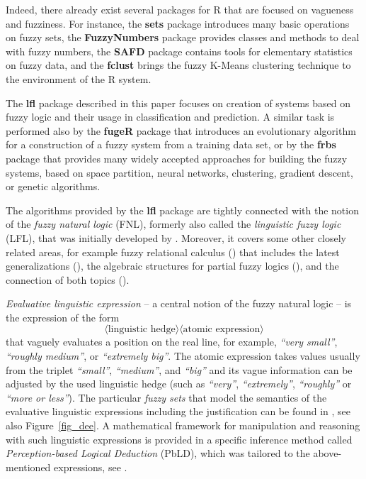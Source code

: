 \documentclass[review]{elsarticle}
\newcommand{\pkg}[1]{\textbf{#1}}
\newcommand{\proglang}[1]{#1}
\newcommand{\R}{\proglang{R}}
\begin{document}
Indeed, there already exist several packages for \R{} that are focused on vagueness and fuzziness. For instance, the \pkg{sets} package \citep{setsPkg} introduces many basic operations on fuzzy sets, the \pkg{FuzzyNumbers} package \citep{FuzzyNumbersPkg} provides classes and methods to deal with fuzzy numbers, the \pkg{SAFD} package \citep{safdPkg} contains tools for elementary statistics on fuzzy data, and the \pkg{fclust} \citep{fclustPkg} brings the fuzzy K-Means clustering technique to the environment of the \R{} system.

The \pkg{lfl} package described in this paper focuses on creation of systems based on fuzzy logic and their
usage in classification and prediction. A similar task is performed also by the \pkg{fugeR}
package \citep{fugeRPkg} that introduces an evolutionary algorithm for a construction of a fuzzy system from
a training data set, or by the \pkg{frbs} package \citep{frbsPkg} that provides many widely
accepted approaches for building the fuzzy systems, based on space partition, neural networks,
clustering, gradient descent, or genetic algorithms.

The algorithms provided by the \pkg{lfl} package are tightly connected with the notion of
the \emph{fuzzy natural logic} (FNL), formerly also called the \emph{linguistic fuzzy logic} (LFL),
that was initially developed by \cite{Novak08}. Moreover, it covers some other closely related areas, for example fuzzy relational calculus  (\cite{BandlerKohout78,Belohlavek_book2002,Behounek:Compositions})  that includes the latest generalizations (\cite{Cao2017, Cao2017b}), the algebraic structures for partial fuzzy logics (\cite{BehounekNovak:IEEE15, BehounekDankova:IPMU16}), and the connection of both topics (\cite{Step_etal_Dragon_IJAR2019}).

\emph{Evaluative linguistic expression} -- a central notion of the fuzzy natural logic -- is the expression of the form
%
$$\langle \textrm{linguistic hedge}\rangle \langle \textrm{atomic expression}\rangle$$
%
that vaguely evaluates a position on the real line, for example, \emph{``very small''}, \emph{``roughly medium''}, or \emph{``extremely big''}. The atomic expression takes values usually from the triplet 
\emph{``small''}, \emph{``medium''}, and \emph{``big''} and its vague information can be adjusted by the used linguistic hedge (such as \emph{``very''}, \emph{``extremely''}, \emph{``roughly''} or \emph{``more or less''}).
The particular \emph{fuzzy sets} that model the semantics of the evaluative linguistic expressions including the justification can be found in \cite{Novak08}, see also Figure~\ref{fig_dee}. A mathematical framework for manipulation and reasoning with
such linguistic expressions is provided in a specific inference method called  \emph{Perception-based
Logical Deduction} (PbLD), which was tailored to the above-mentioned expressions, see \cite{Dvovrak2004formal,Novak:PbLD, Dvorak_etal:RedundancyFSS}.
\end{document}
